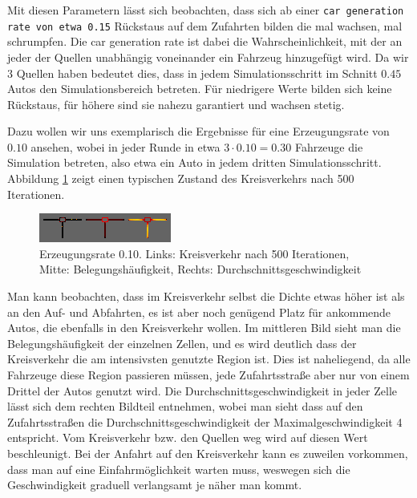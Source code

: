 \documentclass[10pt, a4paper]{article}
\begin{document}
Mit diesen Parametern lässt sich beobachten, dass sich ab einer \texttt{car generation rate von etwa 0.15} Rückstaus auf dem Zufahrten bilden die mal wachsen, mal schrumpfen. Die car generation rate ist dabei die Wahrscheinlichkeit, mit der an jeder der Quellen unabhängig voneinander ein Fahrzeug hinzugefügt wird. Da wir 3 Quellen haben bedeutet dies, dass in jedem Simulationsschritt im Schnitt $0.45$ Autos den Simulationsbereich betreten. Für niedrigere Werte bilden sich keine Rückstaus, für höhere sind sie nahezu garantiert und wachsen stetig.

Dazu wollen wir uns exemplarisch die Ergebnisse für eine Erzeugungsrate von $0.10$ ansehen, wobei in jeder Runde in etwa $3 \cdot 0.10 = 0.30$ Fahrzeuge die Simulation betreten, also etwa ein Auto in jedem dritten Simulationsschritt. Abbildung \ref{fig:roundabout010} zeigt einen typischen Zustand des Kreisverkehrs nach 500 Iterationen.

\begin{figure}[h!]
	\centering
	\includegraphics[width=\textwidth]{img/roundabout_010}
	\caption{Erzeugungsrate 0.10. Links: Kreisverkehr nach 500 Iterationen, Mitte: Belegungshäufigkeit, Rechts: Durchschnittsgeschwindigkeit}
	\label{fig:roundabout010}
\end{figure}

Man kann beobachten, dass im Kreisverkehr selbst die Dichte etwas höher ist als an den Auf- und Abfahrten, es ist aber noch genügend Platz für ankommende Autos, die ebenfalls in den Kreisverkehr wollen. Im mittleren Bild sieht man die Belegungshäufigkeit der einzelnen Zellen, und es wird deutlich dass der Kreisverkehr die am intensivsten genutzte Region ist. Dies ist naheliegend, da alle Fahrzeuge diese Region passieren müssen, jede Zufahrtsstraße aber nur von einem Drittel der Autos genutzt wird. Die Durchschnittsgeschwindigkeit in jeder Zelle lässt sich dem rechten Bildteil entnehmen, wobei man sieht dass auf den Zufahrtsstraßen die Durchschnittsgeschwindigkeit der Maximalgeschwindigkeit 4 entspricht. Vom Kreisverkehr bzw. den Quellen weg wird auf diesen Wert beschleunigt. Bei der Anfahrt auf den Kreisverkehr kann es zuweilen vorkommen, dass man auf eine Einfahrmöglichkeit warten muss, weswegen sich die Geschwindigkeit graduell verlangsamt je näher man kommt.
\end{document}
